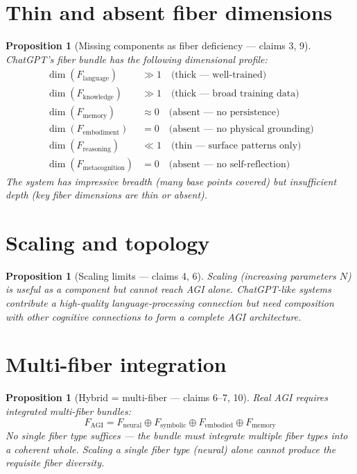 \documentclass[11pt,a4paper]{article}
\newtheorem{proposition}[definition]{Proposition}
\begin{document}
\section{Thin and absent fiber dimensions}

\begin{proposition}[Missing components as fiber deficiency --- claims 3, 9]
\label{prop:thin}
ChatGPT's fiber bundle has the following dimensional profile:
\begin{align*}
  \dim(F_{\text{language}}) &\gg 1 \quad \text{(thick --- well-trained)} \\
  \dim(F_{\text{knowledge}}) &\gg 1 \quad \text{(thick --- broad training data)} \\
  \dim(F_{\text{memory}}) &\approx 0 \quad \text{(absent --- no persistence)} \\
  \dim(F_{\text{embodiment}}) &= 0 \quad \text{(absent --- no physical grounding)} \\
  \dim(F_{\text{reasoning}}) &\ll 1 \quad \text{(thin --- surface patterns only)} \\
  \dim(F_{\text{metacognition}}) &= 0 \quad \text{(absent --- no self-reflection)}
\end{align*}
The system has impressive \emph{breadth} (many base points covered) but
insufficient \emph{depth} (key fiber dimensions are thin or absent).
\end{proposition}

\section{Scaling and topology}

\begin{proposition}[Scaling limits --- claims 4, 6]
\label{prop:scaling}
Scaling (increasing parameters $N$) is useful as a component but cannot
reach AGI alone. ChatGPT-like systems contribute a high-quality
language-processing connection but need composition with other cognitive
connections to form a complete AGI architecture.
\end{proposition}


\section{Multi-fiber integration}

\begin{proposition}[Hybrid = multi-fiber --- claims 6--7, 10]
Real AGI requires integrated multi-fiber bundles:
\[
  F_{\text{AGI}} = F_{\text{neural}} \oplus F_{\text{symbolic}} \oplus
  F_{\text{embodied}} \oplus F_{\text{memory}}
\]
No single fiber type suffices --- the bundle must integrate multiple fiber
types into a coherent whole. Scaling a single fiber type (neural) alone
cannot produce the requisite fiber diversity.
\end{proposition}
\end{document}

